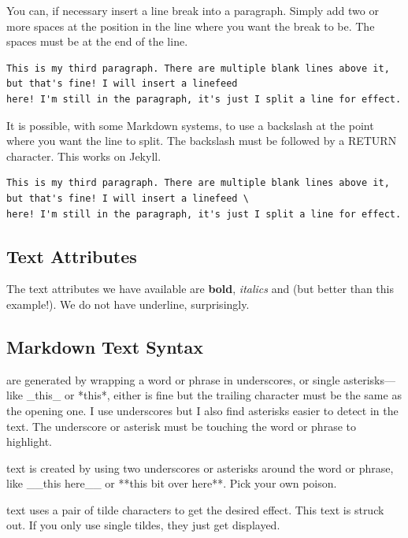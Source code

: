 You can, if necessary insert a line break into a paragraph. Simply add two or more spaces at the position in the line where you want the break to be. The spaces must be at the end of the line.

\begin{lstlisting}[caption={Line breaks within paragraphs.},style=myText]
This is my third paragraph. There are multiple blank lines above it, but that's fine! I will insert a linefeed
here! I'm still in the paragraph, it's just I split a line for effect.
\end{lstlisting}

It is possible, with some Markdown systems, to use a backslash at the point where you want the line to split. The backslash must be followed by a RETURN character. This works on Jekyll.

\begin{lstlisting}[caption={Line breaks within paragraphs.},style=myText]
This is my third paragraph. There are multiple blank lines above it, but that's fine! I will insert a linefeed \
here! I'm still in the paragraph, it's just I split a line for effect.
\end{lstlisting}

\subsection{Text Attributes}\label{sect: Text Attributes}
The text attributes we have available are \textbf{bold}, \textit{italics} and  (but better than this example!). We do not have underline, surprisingly.

\subsection{Markdown Text Syntax}\label{sect: Markdown text Syntax}

\begin{description}
    \item[Italics] are generated by wrapping a word or phrase in underscores, or single asterisks---like \_this\_ or *this*, either is fine but the trailing character must be the same as the opening one. I use underscores but I also find asterisks easier to detect in the text. The underscore or asterisk must be touching the word or phrase to highlight.
    \item[Bold] text is created by using two underscores or asterisks around the word or phrase, like \_\_this here\_\_ or **this bit over here**. Pick your own poison.
    \item[Strike-through] text uses a pair of tilde characters to get the desired effect. This text is \texttildelow{}\texttildelow{}struck out\texttildelow{}\texttildelow{}. If you only use single tildes, they just get displayed.
\end{description}

